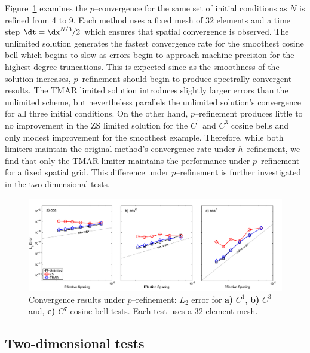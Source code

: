 \documentclass{ametsoc}
\begin{document}
Figure~\ref{fig:cosConv-p} examines the $p$--convergence for the same set of initial conditions as $N$ is refined from 4 to 9. Each method uses a fixed mesh of $32$ elements and a time step $\dt = \dx^{N/3}/2$ which ensures that spatial convergence is observed. The unlimited solution generates the fastest convergence rate for the smoothest cosine bell which begins to slow as errors begin to approach machine precision for the highest degree truncations. This is expected since as the smoothness of the solution increases, $p$--refinement should begin to produce spectrally convergent results. The TMAR limited solution introduces slightly larger errors than the unlimited scheme, but nevertheless parallels the unlimited solution's convergence for all three initial conditions. On the other hand, $p$--refinement produces little to no improvement in the ZS limited solution for the $C^1$ and $C^3$ cosine bells and only modest improvement for the smoothest example. Therefore, while both limiters maintain the original method's convergence rate under $h$--refinement, we find that only the TMAR limiter maintains the performance under $p$--refinement for a fixed spatial grid. This difference under $p$--refinement is further investigated in the two-dimensional tests.

\begin{figure}
\includegraphics[width=\textwidth]{figs/1d/cosbellConvg_nodal.pdf}
\caption{Convergence results under $p$--refinement: $L_2$ error for {\bf a)} $C^1$, {\bf b)} $C^3$ and, {\bf c)} $C^7$ cosine bell tests. Each test uses a 32 element mesh.} \label{fig:cosConv-p}
\end{figure}

\subsection*{Two-dimensional tests}
\end{document}
